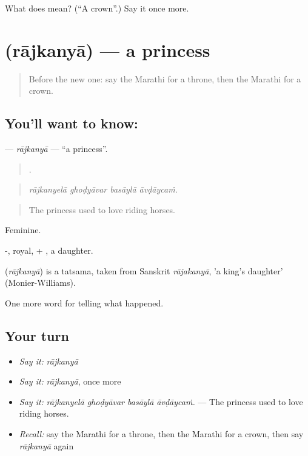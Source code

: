 \begin{tcolorbox}[breakable,colback=teal!4,colframe=teal!35!black,title={Before you move on}]
What does  mean? (\textquotedblleft{}A crown\textquotedblright{}.) Say it once more.
\end{tcolorbox}
\section[\texorpdfstring{\mr{राजकन्या} (rājkanyā)}{राजकन्या (rājkanyā)}]{ (rājkanyā) — a princess}

\label{lesson:MR-C326-rajkanya}



\begin{quote}
Before the new one: say the Marathi for a throne, then the Marathi for a crown.
\end{quote}

\subsection*{You'll want to know: }
\textbf{} — \emph{rājkanyā} — \textquotedblleft{}a princess\textquotedblright{}.

\begin{quote}
   .
\end{quote}

\begin{quote}
\emph{rājkanyelā ghoḍyāvar basāylā āvḍāycaṁ.}
\end{quote}

\begin{quote}
The princess used to love riding horses.
\end{quote}

Feminine.

-, royal, + , a daughter.

\begin{cousinweb}
\textbf{} (\emph{rājkanyā}) is a tatsama, taken from Sanskrit \emph{rājakanyā}, 'a king's daughter' (Monier-Williams).
\end{cousinweb}

\begin{grammarlens}[title={What you've built}]
One more word for telling what happened.
\end{grammarlens}

\subsection*{Your turn}
\begin{itemize}
\raggedright
  \item \emph{Say it:} \emph{rājkanyā}
  \item \emph{Say it:} \emph{rājkanyā}, once more
  \item \emph{Say it:} \emph{rājkanyelā ghoḍyāvar basāylā āvḍāycaṁ.} — The princess used to love riding horses.
  \item \emph{Recall:} say the Marathi for a throne, then the Marathi for a crown, then say \emph{rājkanyā} again
\end{itemize}

